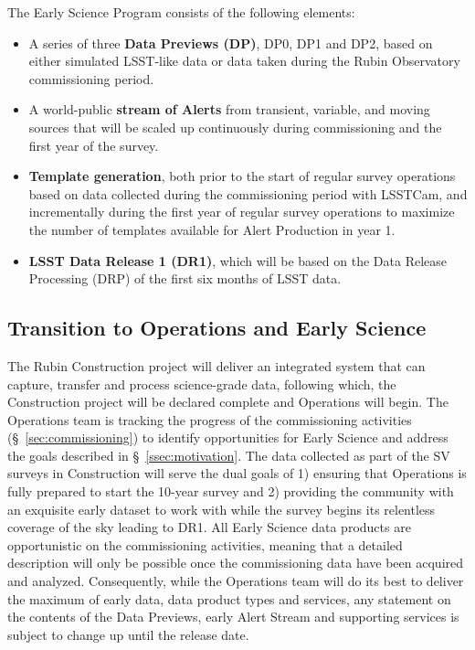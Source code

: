 The Early Science Program consists of the following elements:
\begin{itemize}
	\item A series of three \textbf{Data Previews (DP)}, DP0, DP1 and DP2,  based on either simulated LSST-like data or data taken during the Rubin Observatory commissioning period. 
	\item A world-public \textbf{stream of Alerts} from transient, variable, and moving sources that will be scaled up continuously during commissioning and the first year of the survey. 
	\item  \textbf{Template generation}, both prior to the start of regular survey operations based on data collected during the commissioning period with LSSTCam, and incrementally during the first year of regular survey operations  to maximize the number of templates available for Alert Production in year 1. 
	\item \textbf{LSST Data Release 1 (DR1)}, which will be based on the Data Release Processing (DRP) of the first six months of LSST data.
\end{itemize}

%
\subsection{Transition to Operations and Early Science  } 
\label{ssec:transition}

The Rubin Construction project will deliver an integrated system that can capture, transfer and process science-grade data, following which, the Construction project will be declared complete and Operations will begin. 
The Operations team is tracking the progress of the commissioning activities (\S~\ref{sec:commissioning}) to identify opportunities for Early Science and address the goals described in \S~\ref{ssec:motivation}.
The data collected as part of the SV surveys in Construction will serve the dual goals of 1) ensuring that Operations is fully prepared to start the 10-year survey and 2) providing the community with an exquisite early dataset to work with while the survey begins its relentless coverage of the sky leading to DR1.
All Early Science data products are opportunistic on the commissioning activities, meaning that a detailed description will only be possible once the commissioning data have been acquired and analyzed. 
Consequently, while the Operations team will do its best to deliver the maximum of early data, data product types and services, any statement on the contents of the Data Previews, early Alert Stream and supporting services is subject to change up until the release date. 


